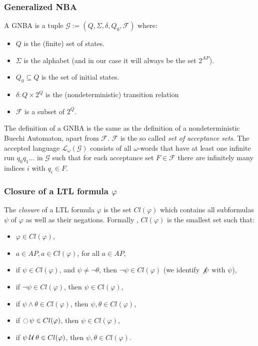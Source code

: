 \documentclass{article}
\begin{document}
\subsubsection*{Generalized NBA}
A GNBA is a tuple $\mathcal{G} := (Q, \Sigma, \delta, Q_0, \mathcal{F})$ where:
\begin{itemize}
    \item $Q$ is the (finite) set of states.
    \item $\Sigma$ is the alphabet (and in our case it will always be the set $2^{AP}$).
    \item $Q_0 \subseteq Q$ is the set of initial states.
    \item $\delta : Q \times 2^{Q}$ is the (nondeterministic) transition relation 
    \item $\mathcal{F}$ is a subset of $2^{Q}$.
\end{itemize}
The definition of a GNBA is the same as the definition of a nondeterministic Buechi Automaton, apart from $\mathcal{F}$.
$\mathcal{F}$ is the so called \emph{set of acceptance sets}. The accepted language $\mathcal{L}_{\omega}(\mathcal{G})$
consists of all $\omega$-words that have at least one infinite run $q_0q_1 \dots$ in $\mathcal{G}$ such that 
for each acceptance set $F \in \mathcal{F}$ there are infinitely many indices $i$ with $q_i \in F$.

\subsubsection*{Closure of a LTL formula $\varphi$}
The \emph{closure} of a LTL formula $\varphi$ is the set $Cl(\varphi)$ which contains all subformulas $\psi$ 
of $\varphi$ as well as their negations. Formally , $Cl(\varphi)$ is the smallest set such that: 
\begin{itemize}
    \item $\varphi \in Cl(\varphi)$,
    \item $a \in AP, a \in Cl(\varphi)$, for all $a \in AP$,
    \item if $\psi \in Cl(\varphi)$, and $\psi \neq \neg \theta$, then $\neg \psi \in Cl(\varphi)$ (we identify $\not \not \psi$ with $\psi$),
    \item if $\neg \psi \in Cl(\varphi)$, then $\psi \in Cl(\varphi)$,
    \item if $\psi \land \theta \in Cl(\varphi)$, then $\psi, \theta \in Cl(\varphi)$,
    \item if $\mathop{\ocircle}{\psi} \in Cl(\varphi)$, then $\psi \in Cl(\varphi)$,
    \item if $\psi \mathbin{\mathcal{U}} \theta \in Cl(\varphi)$, then $\psi, \theta \in Cl(\varphi)$.
\end{itemize}
\end{document}
